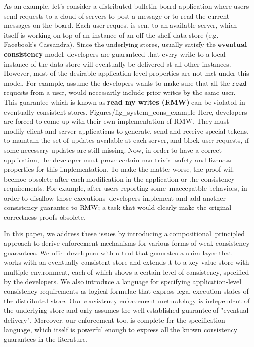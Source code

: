 As an example, let's consider a distributed bulletin board application where users
send requests to a cloud of servers to post a message or to read the current
messages on the board. Each user request is sent to an available server,
which itself is working on top of an instance of an off-the-shelf data
store (e.g. Facebook's Cassandra). 
Since the underlying stores, usually satisfy the {\bf eventual consistency} model, 
developers are guaranteed  that every write to a local instance of the data 
store will eventually  be delivered at all other instances. However, 
most of the desirable application-level properties are not met under this model.          
For example, assume the developers wants to make sure that all the
$\mathtt{read}$ requests from
a user, would necessarily include prior writes by the same user.  This
guarantee which is known as {\bf read my writes (RMW)} can be violated in
eventually consistent stores.  
 {Figures/fig_system_cons_example}
Here, developers are forced to come up with their own implementation of
RMW. They must modify client and server applications to generate, send
and receive special tokens, to maintain the set of updates available at
each server, and block user requests, if some necessary updates are
still missing. Now, in order to have a correct application, the
developer must prove certain non-trivial safety and liveness
properties for this implementation. To make the matter worse, the
proof will becmoe obsolete after each modification in the application or
the consistency requirements. For example, after users reporting some unaccepatble
behaviors, in order to disallow those executions, developers 
implement and add another consistency guarantee to RMW; a task that
would clearly make the original correctness proofs obsolete. 




In this paper, we address these issues by introducing a compositional, principled approach to 
derive enforcement mechanisms for various forms of weak consistency 
guarantees. 
We offer developers with a tool that generates a shim layer that works
with an eventually consistent store and extends it to a key-value store
with multiple environment, each of which shows a certain level of
consistency, specified by the developers. 
We also introduce a language for specifying application-level consistency 
requirements as logical formulae that express legal execution states of the distributed store. 
Our consistency enforcement methodology is independent of the underlying store 
and only assumes the well-established guarantee of "eventual delivery". 
Moreover, our enforcement tool is complete for the specification
language, which itself is powerful enough to express all the known consistency 
guarantees in the literature.

